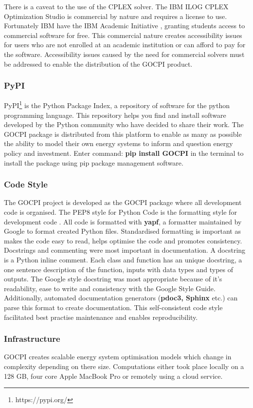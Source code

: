 \documentclass[12pt]{article}
\begin{document}
There is a caveat to the use of the CPLEX solver. The IBM ILOG CPLEX Optimization Studio is commercial by nature and requires a license to use.
Fortunately IBM have the IBM Academic Initiative \cite{IBM_AI}, granting students access to commercial software for free.
This commercial nature creates accessibility issues for users who are not enrolled at an academic institution or can afford to pay for the software.
Accessibility issues caused by the need for commercial solvers must be addressed to enable the distribution of the GOCPI product.

\subsubsection{PyPI}
PyPI\footnote{https://pypi.org/} is the Python Package Index, a repository of software for the python programming language.
This repository helps you find and install software developed by the Python community who have decided to share their work.
The GOCPI package is distributed from this platform to enable as many as possible the ability to model their own energy systems to inform and question energy policy and investment.
Enter command: \textbf{pip install GOCPI} in the terminal to install the package using pip package management software.

\subsubsection{Code Style}
The GOCPI project is developed as the GOCPI package where all development code is organised.
The PEP8 style for Python Code is the formatting style for development code \cite{PEP8}. 
All code is formatted with \textbf{yapf}, a formatter maintained by Google to format created Python files.
Standardised formatting is important as makes the code easy to read, helps optimise the code and promotes consistency.
Docstrings and commenting were most important in documentation. A docstring is a Python inline comment. 
Each class and function has an unique docstring, a one sentence description of the function, inputs with data types and types of outputs.
The Google style docstring was most appropriate because of it's readability, ease to write and consistency with the Google Style Guide.
Additionally, automated documentation generators (\textbf{pdoc3, Sphinx} etc.) can parse this format to create documentation.
This self-consistent code style facilitated best practise maintenance and enables reproducibility.


\subsubsection{Infrastructure}
GOCPI creates scalable energy system optimisation models which change in complexity depending on there size.
Computations either took place locally on a 128 GB, four core Apple MacBook Pro or remotely using a cloud service. 
\end{document}
